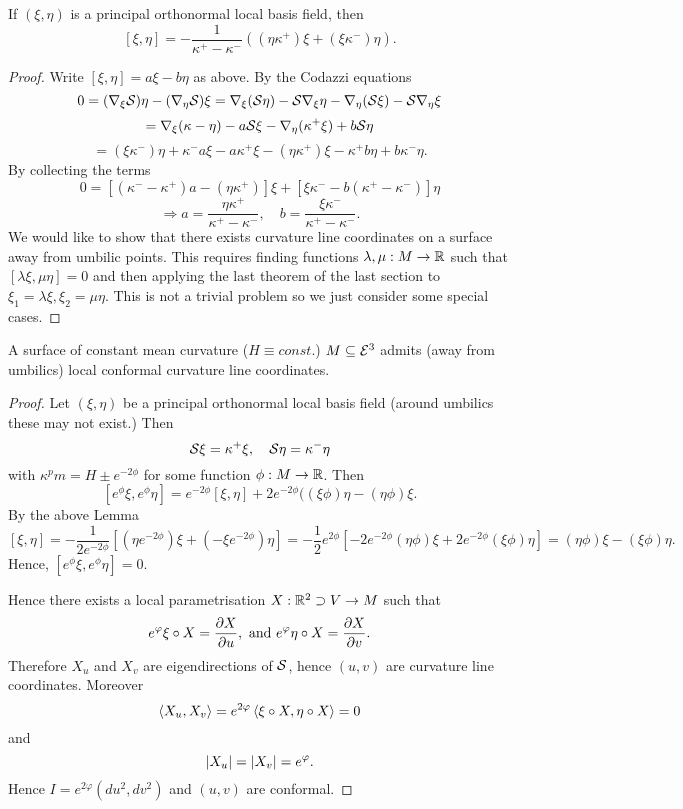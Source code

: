 \begin{lemma}
	
	If $ (\xi,\eta) $ is a principal orthonormal local basis field, then
		\[ [\xi,\eta] = - \dfrac{1}{\kappa^+ - \kappa^-}((\eta\kappa^+)\xi + (\xi\kappa^-)\eta). \]
	
\end{lemma}

\begin{proof}
	
	Write $ [\xi,\eta] = a\xi - b\eta $ as above. By the Codazzi equations
		\[ 0 = (\nabla_\xi \mathcal S)\eta - (\nabla_\eta \mathcal S) \xi = \nabla_\xi(\mathcal S\eta) - \mathcal S\nabla_\xi \eta - \nabla_\eta(\mathcal S\xi) - \mathcal S\nabla_\eta \xi  \]
		\[ = \nabla_\xi(\kappa- \eta) - a \mathcal S \xi - \nabla_\eta(\kappa^+\xi) + b\mathcal S\eta \]
		\[ = (\xi\kappa^-) \eta + \kappa^-a\xi -a\kappa^+\xi - (\eta\kappa^+)\xi - \kappa^+b\eta + b \kappa^-\eta. \]
	By collecting the terms
		\[ 0 = [ (\kappa^- -\kappa^+)a - (\eta\kappa^+) ]\xi + [ \xi \kappa^- - b(\kappa^+ - \kappa^-) ] \eta \]
		\[ \Rightarrow a = \dfrac{\eta \kappa^+}{\kappa^+ - \kappa^-}, \quad b= \dfrac{\xi \kappa^-}{\kappa^+ - \kappa^-}. \]
	We would like to show that there exists curvature line coordinates on a surface away from umbilic points. This requires finding functions $ \lambda,\mu: M \rightarrow \mathbb R $ such that $ [ \lambda\xi,\mu\eta ] = 0 $ and  then applying the last theorem of the last section to $ \xi_1 = \lambda\xi, \xi_2 = \mu \eta $. This is not a trivial problem so we just consider some special cases.
	
			
\end{proof}


\begin{corollary}
	A surface of constant mean curvature ($ H \equiv const. $) $ M \subseteq \mathcal E^3 $ admits (away from umbilics) local conformal curvature line coordinates.
\end{corollary}

\begin{proof}
	
	Let $ (\xi,\eta) $ be a principal orthonormal local basis field (around umbilics these  may not exist.) Then 
		\[ \mathcal S \xi = \kappa^+\xi, \quad \mathcal S \eta = \kappa^-\eta \]
		with $ \kappa^pm = H \pm e^{-2 \phi} $ for some function $ \phi: M \rightarrow \mathbb R $.
	Then 
		\[ [ e^\phi \xi, e^\phi \eta ] =  e^{-2\phi}[\xi,\eta] + 2e^{-2\phi}((\xi \phi)\eta - (\eta\phi)\xi. \]
	By the above Lemma
		\[ [\xi,\eta] = - \dfrac{1}{2e^{-2\phi}}\left[(\eta e^{-2\phi})\xi + (-\xi e^{-2\phi})\eta\right] = - \dfrac{1}{2} e^{2\phi}[ -2e^{-2\phi}(\eta \phi)\xi + 2e^{-2\phi}(\xi \phi) \eta ] = (\eta \phi)\xi - (\xi \phi)\eta. \]
	Hence, $ [ e^\phi \xi , e^\phi \eta ] = 0 $.	
	
	
	Hence there exists a local parametrisation $X: \mathbb R^2 \supset V \to M$ such that
	\[ e^\varphi \xi \circ X= \frac{\partial X}{\partial u}, \text{ and } e^\varphi \eta \circ X = \frac{\partial X}{\partial v}. \]
	Therefore $X_u$ and $X_v$ are eigendirections of $\mathcal S$, hence $(u,v)$ are curvature line coordinates. Moreover
	\[ \left \langle X_u, X_v \right\rangle = e^{2\varphi} \left \langle \xi \circ X , \eta \circ X \right\rangle = 0 \]
	and
	\[ \left| X_u\right| = \left| X_v\right| = e^\varphi. \]
	Hence $I= e^{2\varphi} (du^2,dv^2)$ and $(u,v)$ are conformal.
\end{proof}

